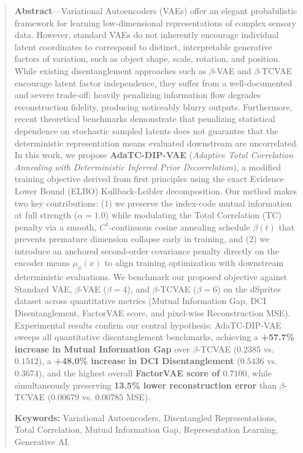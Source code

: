 \documentclass[11pt,a4paper]{article}
\begin{document}
\begin{quote}
\small
\textbf{Abstract}---Variational Autoencoders (VAEs) offer an elegant probabilistic framework for learning low-dimensional representations of complex sensory data. However, standard VAEs do not inherently encourage individual latent coordinates to correspond to distinct, interpretable generative factors of variation, such as object shape, scale, rotation, and position. While existing disentanglement approaches such as $\beta$-VAE and $\beta$-TCVAE encourage latent factor independence, they suffer from a well-documented and severe trade-off: heavily penalizing information flow degrades reconstruction fidelity, producing noticeably blurry outputs. Furthermore, recent theoretical benchmarks demonstrate that penalizing statistical dependence on stochastic sampled latents does not guarantee that the deterministic representation means evaluated downstream are uncorrelated. In this work, we propose \textbf{AdaTC-DIP-VAE} (\textit{Adaptive Total Correlation Annealing with Deterministic Inferred Prior Decorrelation}), a modified training objective derived from first principles using the exact Evidence Lower Bound (ELBO) Kullback-Leibler decomposition. Our method makes two key contributions: (1) we preserve the index-code mutual information at full strength ($\alpha = 1.0$) while modulating the Total Correlation (TC) penalty via a smooth, $C^1$-continuous cosine annealing schedule $\beta(t)$ that prevents premature dimension collapse early in training, and (2) we introduce an anchored second-order covariance penalty directly on the encoder means $\mu_\phi(x)$ to align training optimization with downstream deterministic evaluations. We benchmark our proposed objective against Standard VAE, $\beta$-VAE ($\beta=4$), and $\beta$-TCVAE ($\beta=6$) on the dSprites dataset across quantitative metrics (Mutual Information Gap, DCI Disentanglement, FactorVAE score, and pixel-wise Reconstruction MSE). Experimental results confirm our central hypothesis: AdaTC-DIP-VAE sweeps all quantitative disentanglement benchmarks, achieving a \textbf{+57.7\% increase in Mutual Information Gap} over $\beta$-TCVAE ($0.2385$ vs. $0.1512$), a \textbf{+48.0\% increase in DCI Disentanglement} ($0.5436$ vs. $0.3674$), and the highest overall \textbf{FactorVAE score of $0.7100$}, while simultaneously preserving \textbf{13.5\% lower reconstruction error} than $\beta$-TCVAE ($0.00679$ vs. $0.00785$ MSE).

\vspace{0.4em}
\noindent \textbf{Keywords:} Variational Autoencoders, Disentangled Representations, Total Correlation, Mutual Information Gap, Representation Learning, Generative AI.
\end{quote}
\end{document}

